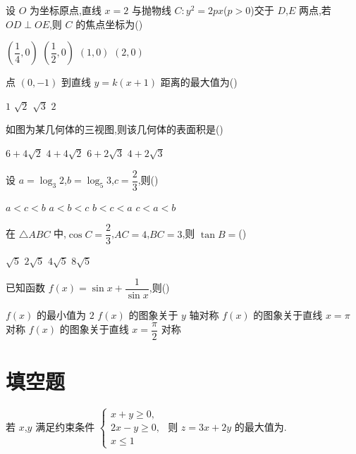 \begin{problem}
设 \(O\) 为坐标原点,直线 \(x=2\) 与抛物线 \(C:y^2=2px\)(\(p>0\))交于 \(D\),\(E\) 两点,若 \(OD\perp OE\),则 \(C\) 的焦点坐标为(\quad)

\choices
    {\(\left( \dfrac{1}{4},0 \right)\)}
    {\(\left( \dfrac{1}{2},0 \right)\)}
    {\((1,0)\)}
    {\((2,0)\)}
\end{problem}

\begin{problem}
点 \((0,-1)\) 到直线 \(y=k(x+1)\) 距离的最大值为(\quad)

\choices
    {\(1\)}
    {\(\sqrt2\)}
    {\(\sqrt3\)}
    {\(2\)}
\end{problem}

\begin{problem}
如图为某几何体的三视图,则该几何体的表面积是(\quad)


\choices
    {\(6+4\sqrt2\)}
    {\(4+4\sqrt2\)}
    {\(6+2\sqrt3\)}
    {\(4+2\sqrt3\)}
\end{problem}

\begin{problem}
设 \(a=\log_3 2\),\(b=\log_5 3\),\(c=\dfrac{2}{3}\),则(\quad)

\choices
    {\(a<c<b\)}
    {\(a<b<c\)}
    {\(b<c<a\)}
    {\(c<a<b\)}
\end{problem}

\begin{problem}
在 \(\triangle ABC\) 中,\(\cos C=\dfrac{2}{3}\),\(AC=4\),\(BC=3\),则 \(\tan B=\)(\quad)

\choices
    {\(\sqrt5\)}
    {\(2\sqrt5\)}
    {\(4\sqrt5\)}
    {\(8\sqrt5\)}
\end{problem}

\begin{problem}
已知函数 \(f(x)=\sin x+\dfrac{1}{\sin x}\),则(\quad)

\choices
    {\(f(x)\) 的最小值为 \(2\)}
    {\(f(x)\) 的图象关于 \(y\) 轴对称}
    {\(f(x)\) 的图象关于直线 \(x=\pi\) 对称}
    {\(f(x)\) 的图象关于直线 \(x=\dfrac{\pi}{2}\) 对称}
\end{problem}

\section{填空题}

\begin{problem}
若 \(x\),\(y\) 满足约束条件
\(\begin{cases}
x+y\ge 0,\\
2x-y\ge 0,\\
x\le 1
\end{cases}\)
则 \(z=3x+2y\) 的最大值为\fillinblank{}.
\end{problem}

